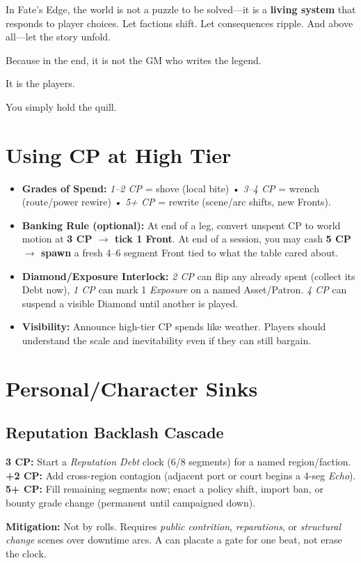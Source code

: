 In Fate’s Edge, the world is not a puzzle to be solved—it is a \textbf{living system} that responds to player choices. Let factions shift. Let consequences ripple. And above all—let the story unfold.

Because in the end, it is not the GM who writes the legend.

It is the players.

You simply hold the quill.

\section{Using CP at High Tier}
\begin{itemize}
  \item \textbf{Grades of Spend:} \emph{1--2 CP} = shove (local bite) • \emph{3--4 CP} = wrench (route/power rewire) • \emph{5+ CP} = rewrite (scene/arc shifts, new Fronts).
  \item \textbf{Banking Rule (optional):} At end of a leg, convert unspent CP to world motion at \textbf{3 CP $\to$ tick 1 Front}. At end of a session, you may cash \textbf{5 CP $\to$ spawn} a fresh 4–6 segment Front tied to what the table cared about.
  \item \textbf{Diamond/Exposure Interlock:} \emph{2 CP} can \/flip\/ any \SuitDiamond{} already spent (collect its Debt now), \emph{1 CP} can mark 1 \emph{Exposure} on a named Asset/Patron. \emph{4 CP} can suspend a visible Diamond until another is played.
  \item \textbf{Visibility:} Announce high-tier CP spends like weather. Players should understand the scale and inevitability even if they can still bargain.
\end{itemize}

\section{Personal/Character Sinks}
\subsection{Reputation Backlash Cascade}
\begin{tcolorbox}[enhanced,breakable,sharp corners,boxrule=.6pt,title={CP Menu}]
\textbf{3 CP:} Start a \emph{Reputation Debt} clock (6/8 segments) for a named region/faction.\\
\textbf{+2 CP:} Add cross-region contagion (adjacent port or court begins a 4-seg \emph{Echo}).\\
\textbf{5+ CP:} Fill remaining segments now; enact a policy shift, import ban, or bounty grade change (permanent until campaigned down).
\end{tcolorbox}
\textbf{Mitigation:} Not by rolls. Requires \emph{public contrition}, \emph{reparations}, or \emph{structural change} scenes over downtime arcs. A \SuitDiamond{} can placate a gate for one beat, not erase the clock.

